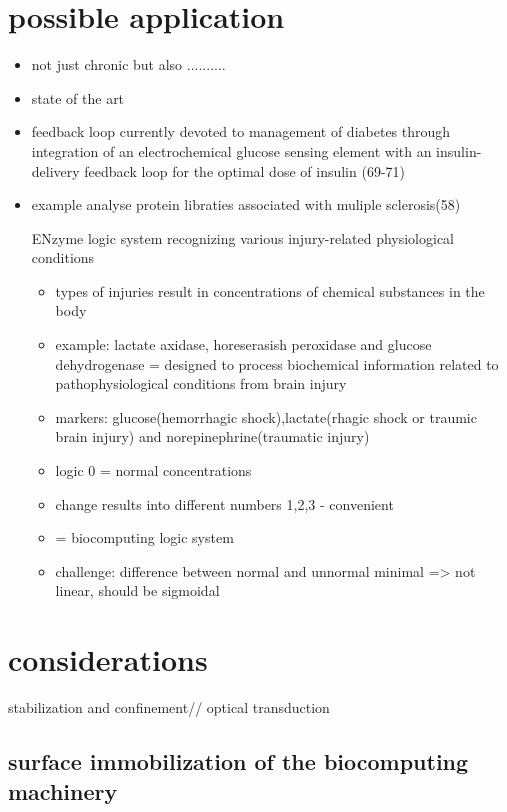 \documentclass[runningheads]{llncs}
\begin{document}
\section{possible application}
	\begin{itemize}
		\item not just chronic but also ..........
		\item state of the art
		\item feedback loop currently devoted to management of diabetes through integration of an electrochemical glucose sensing element with an insulin-delivery feedback loop for the optimal dose of insulin (69-71)
		\item example analyse protein libraties associated with muliple sclerosis(58)
		
		ENzyme logic system recognizing various injury-related physiological conditions
		\begin{itemize}
			\item types of injuries result in concentrations of chemical substances in the body
			\\	
			\item example: lactate axidase, horeserasish peroxidase and glucose dehydrogenase = designed to process biochemical information related to pathophysiological conditions from brain injury
			\item markers: glucose(hemorrhagic shock),lactate(rhagic shock or traumic brain injury) and norepinephrine(traumatic injury)
			\item logic 0 = normal concentrations
			\item change results into different numbers 1,2,3 - convenient
			\item = biocomputing logic system 
			\item challenge: difference between normal and unnormal minimal => not linear, should be sigmoidal	
		\end{itemize}
	\end{itemize}



\section{considerations}
stabilization and confinement//
optical transduction 
\subsection{surface immobilization of the biocomputing machinery}
	
\end{document}
